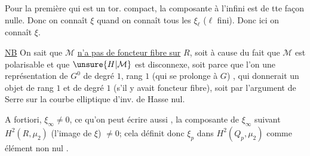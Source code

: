 Pour la première qui est un tor. compact, la composante à l'infini est de tte façon nulle. Donc on connaît $\xi$ quand on connaît tous les $\xi_\ell$ ($\ell$ fini). Donc ici on  connaît $\xi$.

\uline{NB} On sait  que $\mathcal M$ \uline{n'a pas de foncteur fibre sur} $R$,  soit à cause du fait que $\mathcal M$ est polarisable et que $\unsure{H|\mathcal M}$ est disconnexe, soit parce que l'on   une représentation de $G^0$ de degré $1$, rang $1$ (qui se prolonge à $G$)  , qui donnerait un objet de  rang $1$ et de degré $1$ (s'il y avait foncteur fibre), soit par l'argument de Serre sur la courbe elliptique d'inv. de Hasse nul.

A fortiori, $\xi_\infty\ne0$, ce qu'on peut écrire aussi , la composante de $\xi_\infty$ suivant $H^2(R,\mu_2)$  (l'image de  $\xi$) $\ne0$; cela définit donc  $\xi_p$  dans $H^2(Q_p,\mu_2)$ comme  élément non nul .
